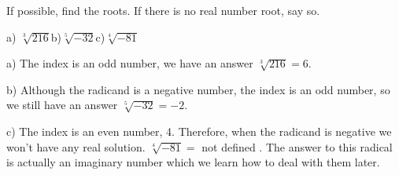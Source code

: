 \begin{exa}
If possible, find the roots. If there is no real number root, say so.

\vspace{0.3cm}
a) $\sqrt[3]{216}$\qquad b)$\sqrt[5]{-32}$\qquad  c)$\sqrt[4]{-81}$
\end{exa}
\vspace{0.5cm}
a) The index is an odd number, we have an answer $\sqrt[3]{216}=6$.

\vspace{0.5cm}
b) Although the radicand is a negative number, the index is an odd number, so we still have an answer $\sqrt[5]{-32}=-2$.
\vspace{0.5cm}


c) The index is an even number, 4. Therefore, when the radicand is negative we won't have any real solution. $\sqrt[4]{-81}=$ not defined \xmark. The answer to this radical is actually an imaginary number which we learn how to deal with them later.
